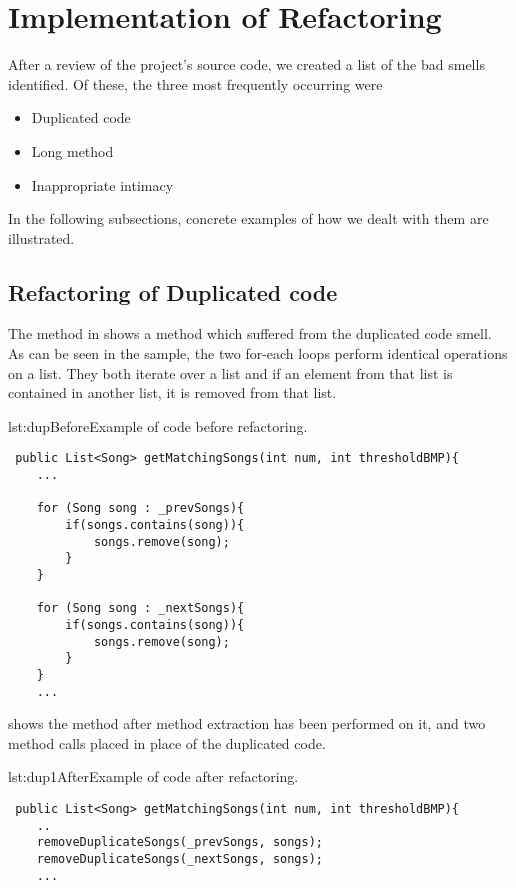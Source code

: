 \section{Implementation of Refactoring}
After a review of the project's source code, we created a list of the bad smells identified. Of these, the three most frequently occurring were
\begin{itemize}
\item Duplicated code
\item Long method
\item Inappropriate intimacy
\end{itemize}

In the following subsections, concrete examples of how we dealt with them are illustrated. 
\subsection{Refactoring of Duplicated code}
The method in  shows a method which suffered from the duplicated code smell. As can be seen in the sample, the two for-each loops perform identical operations on a list. They both iterate over a list and if an element from that list is contained in another list, it is removed from that list.

\begin{code}{lst:dupBefore}{Example of code before refactoring.}
\begin{lstlisting}
 public List<Song> getMatchingSongs(int num, int thresholdBMP){
    ...

    for (Song song : _prevSongs){
        if(songs.contains(song)){
            songs.remove(song);
        }
    }

    for (Song song : _nextSongs){
        if(songs.contains(song)){
            songs.remove(song);
        }
    }
    ...
\end{lstlisting}
\end{code}

 shows the method after method extraction has been performed on it, and two method calls placed in place of the duplicated code.

\begin{code}{lst:dup1After}{Example of code after refactoring.}
\begin{lstlisting}
 public List<Song> getMatchingSongs(int num, int thresholdBMP){
    ..
    removeDuplicateSongs(_prevSongs, songs);
    removeDuplicateSongs(_nextSongs, songs);
    ...
\end{lstlisting}
\end{code}

